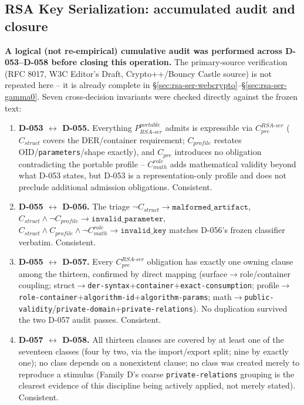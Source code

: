 \documentclass[11pt,a4paper]{article}
\begin{document}
\subsection{RSA Key Serialization: accumulated audit and closure}\label{sec:rsa-ser-closure}

\textbf{A logical (not re-empirical) cumulative audit was performed across D-053--D-058 before closing this operation.} The primary-source verification (RFC 8017, W3C Editor's Draft, Crypto++/Bouncy Castle source) is not repeated here -- it is already complete in \S\ref{sec:rsa-ser-webcrypto}--\S\ref{sec:rsa-ser-gamma0}. Seven cross-decision invariants were checked directly against the frozen text:

\begin{enumerate}
\item \textbf{D-053 $\leftrightarrow$ D-055.} Everything $P_{RSA\text{-}ser}^{portable}$ admits is expressible via $C_{pre}^{RSA\text{-}ser}$ ($C_{struct}$ covers the DER/container requirement; $C_{profile}$ restates OID/\texttt{parameters}/shape exactly), and $C_{pre}$ introduces no obligation contradicting the portable profile -- $C_{math}^{role}$ adds mathematical validity beyond what D-053 states, but D-053 is a representation-only profile and does not preclude additional admission obligations. Consistent.
\item \textbf{D-055 $\leftrightarrow$ D-056.} The triage $\neg C_{struct}\to\texttt{malformed\_artifact}$, $C_{struct}\wedge\neg C_{profile}\to\texttt{invalid\_parameter}$, $C_{struct}\wedge C_{profile}\wedge\neg C_{math}^{role}\to\texttt{invalid\_key}$ matches D-056's frozen classifier verbatim. Consistent.
\item \textbf{D-055 $\leftrightarrow$ D-057.} Every $C_{pre}^{RSA\text{-}ser}$ obligation has exactly one owning clause among the thirteen, confirmed by direct mapping (surface$\to$role/container coupling; struct$\to$\texttt{der-syntax}+\texttt{container}+\texttt{exact-consumption}; profile$\to$\texttt{role-container}+\texttt{algorithm-id}+\texttt{algorithm-params}; math$\to$\texttt{public-validity}/\texttt{private-domain}+\texttt{private-relations}). No duplication survived the two D-057 audit passes. Consistent.
\item \textbf{D-057 $\leftrightarrow$ D-058.} All thirteen clauses are covered by at least one of the seventeen classes (four by two, via the import/export split; nine by exactly one); no class depends on a nonexistent clause; no class was created merely to reproduce a stimulus (Family D's coarse \texttt{private-relations} grouping is the clearest evidence of this discipline being actively applied, not merely stated). Consistent.

\end{enumerate}
\end{document}
